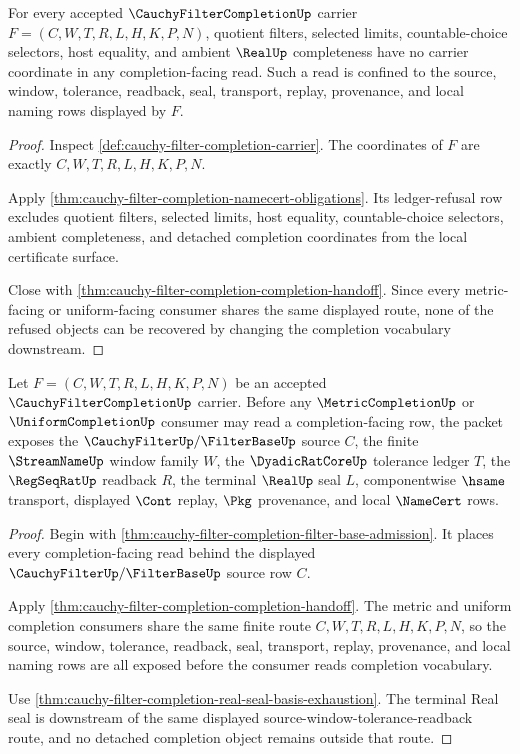\begin{theorem}
\label{thm:cauchy-filter-completion-non-choice-boundary}
For every accepted $\CauchyFilterCompletionUp$ carrier $F=(C,W,T,R,L,H,K,P,N)$, quotient filters, selected limits, countable-choice selectors, host equality, and ambient $\RealUp$ completeness have no carrier coordinate in any completion-facing read. Such a read is confined to the source, window, tolerance, readback, seal, transport, replay, provenance, and local naming rows displayed by $F$.
\end{theorem}
\begin{proof}
Inspect \autoref{def:cauchy-filter-completion-carrier}. The coordinates of $F$ are exactly $C,W,T,R,L,H,K,P,N$.

Apply \autoref{thm:cauchy-filter-completion-namecert-obligations}. Its ledger-refusal row excludes quotient filters, selected limits, host equality, countable-choice selectors, ambient completeness, and detached completion coordinates from the local certificate surface.

Close with \autoref{thm:cauchy-filter-completion-completion-handoff}. Since every metric-facing or uniform-facing consumer shares the same displayed route, none of the refused objects can be recovered by changing the completion vocabulary downstream.
\end{proof}

\begin{theorem}
\label{thm:cauchy-filter-completion-source-window-totality}
Let $F=(C,W,T,R,L,H,K,P,N)$ be an accepted $\CauchyFilterCompletionUp$ carrier. Before any $\MetricCompletionUp$ or $\UniformCompletionUp$ consumer may read a completion-facing row, the packet exposes the $\CauchyFilterUp/\FilterBaseUp$ source $C$, the finite $\StreamNameUp$ window family $W$, the $\DyadicRatCoreUp$ tolerance ledger $T$, the $\RegSeqRatUp$ readback $R$, the terminal $\RealUp$ seal $L$, componentwise $\hsame$ transport, displayed $\Cont$ replay, $\Pkg$ provenance, and local $\NameCert$ rows.
\end{theorem}
\begin{proof}
Begin with \autoref{thm:cauchy-filter-completion-filter-base-admission}. It places every completion-facing read behind the displayed $\CauchyFilterUp/\FilterBaseUp$ source row $C$.

Apply \autoref{thm:cauchy-filter-completion-completion-handoff}. The metric and uniform completion consumers share the same finite route $C,W,T,R,L,H,K,P,N$, so the source, window, tolerance, readback, seal, transport, replay, provenance, and local naming rows are all exposed before the consumer reads completion vocabulary.

Use \autoref{thm:cauchy-filter-completion-real-seal-basis-exhaustion}. The terminal Real seal is downstream of the same displayed source-window-tolerance-readback route, and no detached completion object remains outside that route.
\end{proof}

